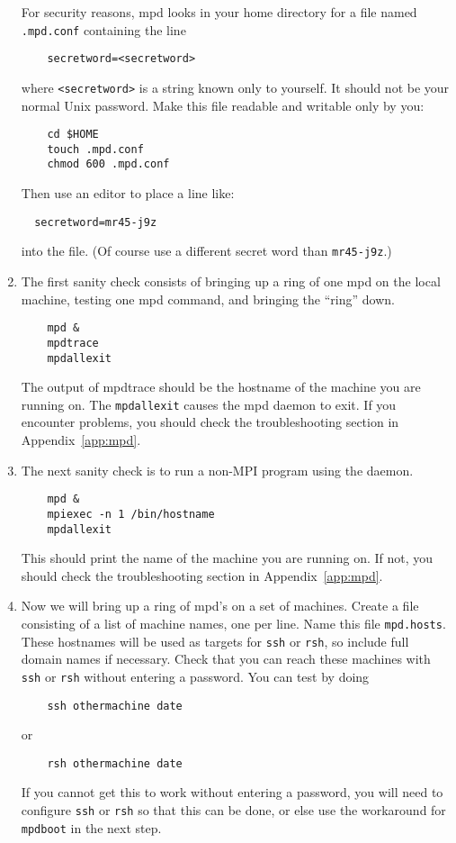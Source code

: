 \documentclass[dvipdfm,11pt]{article}
\begin{document}
\begin{enumerate}
For security reasons, mpd looks in your home directory for a file named
\texttt{.mpd.conf} containing the line
\begin{verbatim}
    secretword=<secretword>
\end{verbatim}
where \verb+<secretword>+ is a string known only to yourself.  It should
not be your normal Unix password.  Make this file readable and writable
only by you:
\begin{verbatim}
    cd $HOME
    touch .mpd.conf
    chmod 600 .mpd.conf
\end{verbatim}
Then use an editor to place a line like:
\begin{verbatim}
  secretword=mr45-j9z
\end{verbatim}
into the file.
(Of course use a different secret word than \verb+mr45-j9z+.)

\item
The first sanity check consists of bringing up a ring of one mpd on
the local machine, testing one mpd command, and bringing the ``ring''
down. 
\begin{verbatim}
    mpd & 
    mpdtrace
    mpdallexit
\end{verbatim}
The output of mpdtrace should be the hostname of the machine you are
running on.  The \texttt{mpdallexit} causes the mpd daemon to exit.
If you encounter problems,
you should check the troubleshooting section in Appendix~\ref{app:mpd}.

\item
The next sanity check is to run a non-MPI program using the daemon.
\begin{verbatim}
    mpd & 
    mpiexec -n 1 /bin/hostname
    mpdallexit
\end{verbatim}
This should print the name of the machine you are running on.  If not,
you should check the troubleshooting section in Appendix~\ref{app:mpd}.

\item
Now we will bring up a ring of mpd's on a set of machines.  Create
a file consisting of a list of machine names, one per line.  Name this
file \texttt{mpd.hosts}.  These hostnames will be used as targets for
\texttt{ssh} or \texttt{rsh}, so include full domain names if necessary.  Check that you
can reach these machines with \texttt{ssh} or \texttt{rsh} without
entering a password.  You can test by doing
\begin{verbatim}
    ssh othermachine date
\end{verbatim}
or
\begin{verbatim}
    rsh othermachine date
\end{verbatim}
If you cannot get this to work without entering a password, you will
need to configure \texttt{ssh} or \texttt{rsh} so that this can be done,
or else use the workaround for \texttt{mpdboot} in the next step.


\end{enumerate}
\end{document}
